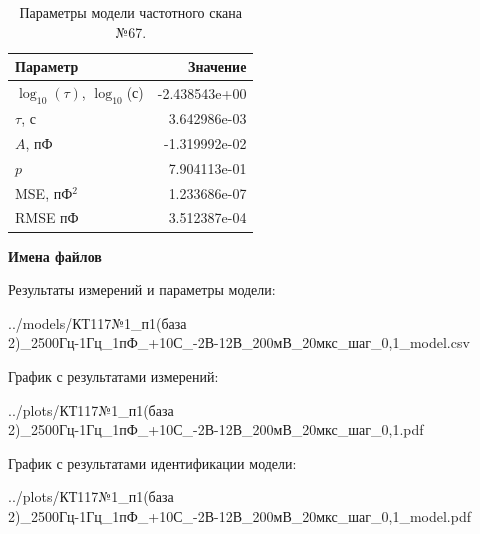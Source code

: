 \begin{table}[!ht]
    \centering
    \caption{Параметры модели частотного скана №67.}
    \begin{tabular}{|l|r|}
        \hline
        Параметр                                       & Значение                  \\ \hline
        $\log_{10}(\tau)$, $\log_{10}$(с)              & -2.438543e+00             \\ \hline
        $\tau$, с                                      & 3.642986e-03              \\ \hline
        $A$, пФ                                        & -1.319992e-02             \\ \hline
        $p$                                            & 7.904113e-01              \\ \hline
        MSE, пФ$^2$                                    & 1.233686e-07              \\ \hline
        RMSE пФ                                        & 3.512387e-04              \\ \hline
    \end{tabular}
    \label{table:frequency_scan_model_67}
\end{table}

\textbf{Имена файлов}

Результаты измерений и параметры модели:

\scriptsize../models/КТ117№1\_п1(база 2)\_2500Гц-1Гц\_1пФ\_+10С\_-2В-12В\_200мВ\_20мкс\_шаг\_0,1\_model.csv
\normalsize

График с результатами измерений:

\scriptsize../plots/КТ117№1\_п1(база 2)\_2500Гц-1Гц\_1пФ\_+10С\_-2В-12В\_200мВ\_20мкс\_шаг\_0,1.pdf
\normalsize

График с результатами идентификации модели:

\scriptsize../plots/КТ117№1\_п1(база 2)\_2500Гц-1Гц\_1пФ\_+10С\_-2В-12В\_200мВ\_20мкс\_шаг\_0,1\_model.pdf
\normalsize

